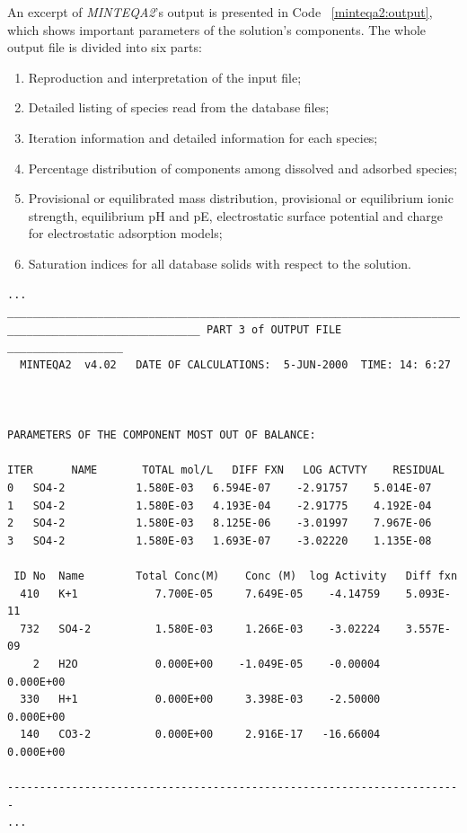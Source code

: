 An excerpt of \emph{MINTEQA2}'s output is presented in Code ~\ref{minteqa2:output}, which shows important parameters of the solution's components. The whole output file is divided into six parts:
\begin{enumerate}
\item Reproduction and interpretation of the input file;
\item Detailed listing of species read from the database files;
\item Iteration information and detailed information for each species;
\item Percentage distribution of components among dissolved and adsorbed species;
\item Provisional or equilibrated mass distribution, provisional or equilibrium ionic strength, equilibrium pH and pE, electrostatic surface potential and charge for electrostatic adsorption models;
\item Saturation indices for all database solids with respect to the solution.
\end{enumerate}


\begin{minipage}[c]{0.92\textwidth}
\begin{lstlisting}[frame=single, caption=\emph{MINTEQA2}'s excerpt from the output file, label=minteqa2:output]
...
_______________________________________________________________________
______________________________ PART 3 of OUTPUT FILE __________________
  MINTEQA2  v4.02   DATE OF CALCULATIONS:  5-JUN-2000  TIME: 14: 6:27



PARAMETERS OF THE COMPONENT MOST OUT OF BALANCE:

ITER      NAME       TOTAL mol/L   DIFF FXN   LOG ACTVTY    RESIDUAL
0   SO4-2           1.580E-03   6.594E-07    -2.91757    5.014E-07
1   SO4-2           1.580E-03   4.193E-04    -2.91775    4.192E-04
2   SO4-2           1.580E-03   8.125E-06    -3.01997    7.967E-06
3   SO4-2           1.580E-03   1.693E-07    -3.02220    1.135E-08

 ID No  Name        Total Conc(M)    Conc (M)  log Activity   Diff fxn
  410   K+1            7.700E-05     7.649E-05    -4.14759    5.093E-11
  732   SO4-2          1.580E-03     1.266E-03    -3.02224    3.557E-09
    2   H2O            0.000E+00    -1.049E-05    -0.00004    0.000E+00
  330   H+1            0.000E+00     3.398E-03    -2.50000    0.000E+00
  140   CO3-2          0.000E+00     2.916E-17   -16.66004    0.000E+00

-----------------------------------------------------------------------
...
\end{lstlisting}
\end{minipage}

